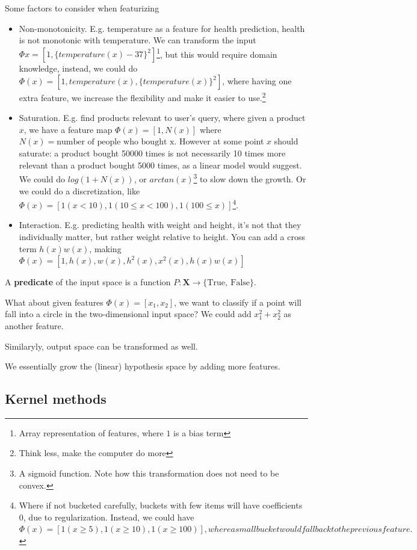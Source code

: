 \documentclass{article}
\begin{document}
Some factors to consider when featurizing
\begin{itemize}
  \item Non-monotonicity. E.g. temperature as a feature for health prediction, health is not monotonic with temperature. We can transform the input $\Phi{x} = [1, \{temperature(x) - 37\}^2]$\footnote{Array representation of features, where $1$ is a bias term}, but this would require domain knowledge, instead, we could do $\Phi(x) = [1, temperature(x), \{temperature(x)\}^2]$, where having one extra feature, we increase the flexibility and make it easier to use.\footnote{Think less, make the computer do more}
  \item Saturation. E.g. find products relevant to user's query, where given a product $x$, we have a feature map $\Phi(x) = [1, N(x)]$ where $N(x) = \text{number of people who bought x}$. However at some point $x$ should saturate: a product bought 50000 times is not necessarily 10 times more relevant than a product bought 5000 times, as a linear model would suggest. We could do $log(1 + N(x))$, or $arctan(x)$\footnote{A sigmoid function. Note how this transformation does not need to be convex.} to slow down the growth. Or we could do a discretization, like $\Phi(x) = [1 (x < 10), 1 (10 \leq x < 100), 1 (100 \leq x)]$\footnote{Where if not bucketed carefully, buckets with few items will have coefficients $0$, due to regularization. Instead, we could have $\Phi(x) = [1 (x \geq 5), 1 (x \geq 10), 1 (x \geq 100)], where a small bucket would fall back to the previous feature.$}.
  \item Interaction. E.g. predicting health with weight and height, it's not that they individually matter, but rather weight relative to height. You can add a cross term $h(x)w(x)$, making $\Phi(x) = [1, h(x), w(x), h^2(x), x^2(x), h(x)w(x)]$
\end{itemize}

A \textbf{predicate} of the input space is a function $P : \mathbf{X} \to \{\text{True},~\text{False}\}$.

What about given features $\Phi(x) = [x_1, x_2]$, we want to classify if a point will fall into a circle in the two-dimensional input space? We could add $x_1^2 + x_2^2$ as another feature.

Similaryly, output space can be transformed as well.

We essentially grow the (linear) hypothesis space by adding more features.

\subsection{Kernel methods}
\end{document}
